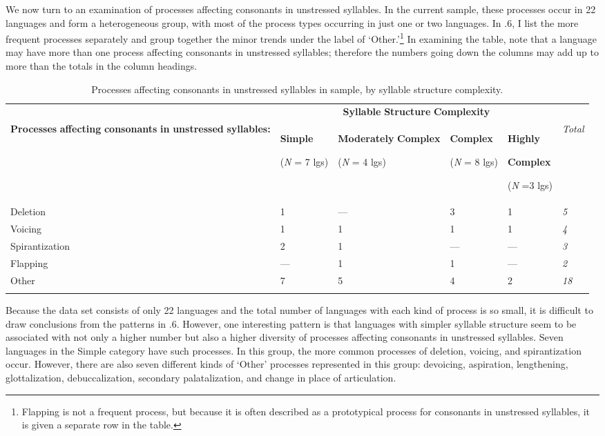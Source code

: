   We now turn to an examination of processes affecting consonants in unstressed syllables. In the current sample, these processes occur in 22 languages and form a heterogeneous group, with most of the process types occurring in just one or two languages. In .6, I list the more frequent processes separately and group together the minor trends under the label of ‘Other.’\footnote{ \textrm{Flapping is not a frequent process, but because it is often described as a prototypical process for consonants in unstressed syllables, it is given a separate row in the table.}} In examining the table, note that a language may have more than one process affecting consonants in unstressed syllables; therefore the numbers going down the columns may add up to more than the totals in the column headings.

\begin{table}
\begin{tabularx}{\textwidth}{XXXXXX}
\lsptoprule
 & \multicolumn{4}{c}{ \textbf{Syllable} \textbf{Structure} \textbf{Complexity}} & \\
 \textbf{Processes} \textbf{affecting} \textbf{consonants} \textbf{in} \textbf{unstressed} \textbf{syllables:} & { \textbf{Simple}}

 (\textit{N} = 7 lgs) & { \textbf{Moderately} \textbf{Complex}}

 (\textit{N} = 4 lgs) & { \textbf{Complex}}

 (\textit{N} = 8 lgs) & { \textbf{Highly} }

{ \textbf{Complex}}

 (\textit{N} =3 lgs) & \textit{Total}\\
 Deletion & 1 & — & 3 & 1 & \textit{5}\\
 Voicing & 1 & 1 & 1 & 1 & \textit{4}\\
 Spirantization & 2 & 1 & — & — & \textit{3}\\
 Flapping & — & 1 & 1 & — & \textit{2}\\
 Other & 7 & 5 & 4 & 2 & \textit{18}\\
\lspbottomrule
\end{tabularx}
\caption{\label{5.6}Processes affecting consonants in unstressed syllables in sample, by syllable structure complexity.}
\end{table}

  Because the data set consists of only 22 languages and the total number of languages with each kind of process is so small, it is difficult to draw conclusions from the patterns in .6. However, one interesting pattern is that languages with simpler syllable structure seem to be associated with not only a higher number but also a higher diversity of processes affecting consonants in unstressed syllables. Seven languages in the Simple category have such processes. In this group, the more common processes of deletion, voicing, and spirantization occur. However, there are also seven different kinds of ‘Other’ processes represented in this group: devoicing, aspiration, lengthening, glottalization, debuccalization, secondary palatalization, and change in place of articulation.

